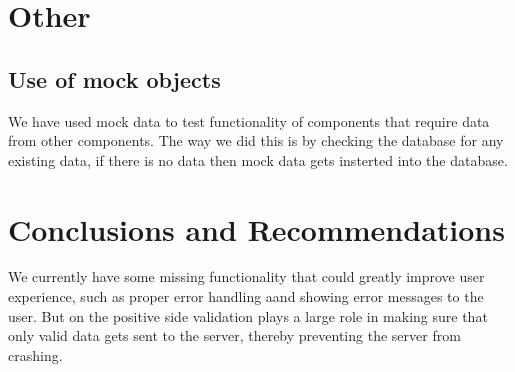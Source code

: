 \documentclass[11pt,fleqn]{book} %
\begin{document}

\chapter{Other}
	\section{Use of mock objects}
	We have used mock data to test functionality of components that require data from other components. The way we did this is by checking the database for any existing data, if there is no data then mock data gets insterted into the database.


\chapter{Conclusions and Recommendations}
We currently have some missing functionality that could greatly improve user experience, such as proper error handling aand showing error messages to the user. But on the positive side validation plays a large role in making sure that only valid data gets sent to the server, thereby preventing the server from crashing.
\end{document}
